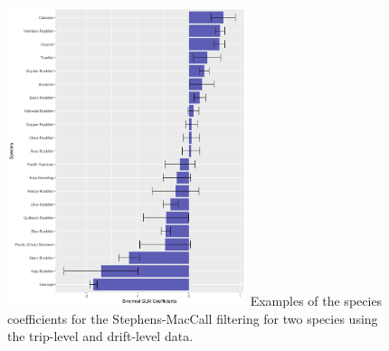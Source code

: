 \documentclass[
  authoryear,
  preprint,
  3p]{elsarticle}
\begin{document}
\begin{figure}
\begin{minipage}[t]{0.50\linewidth}
{{}

}

\end{minipage}%
\newline
\begin{minipage}[t]{0.50\linewidth}

{\centering 


}

\end{minipage}%

\caption{\label{fig-sm}\includegraphics[width=2.75in,height=\textheight]{figures/brown_drift_sm.png}
Examples of the species coefficients for the Stephens-MacCall filtering
for two species using the trip-level and drift-level data.}

\end{figure}
\end{document}
